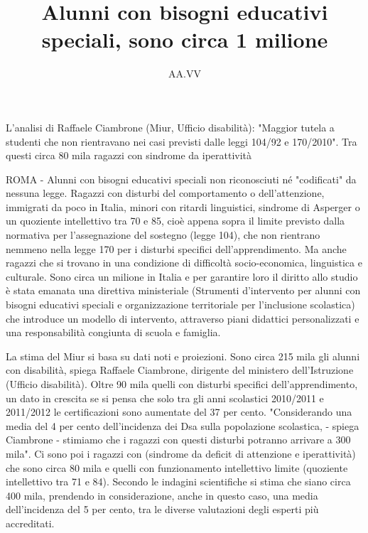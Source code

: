 \author{AA.VV}
\title{Alunni con bisogni educativi speciali, sono circa 1 milione}
\label{cha:ciambrone110613}
\maketitle
L'analisi di Raffaele Ciambrone (Miur, Ufficio disabilità): "Maggior tutela a studenti che non rientravano nei casi previsti dalle leggi 104/92 e 170/2010". Tra questi circa 80 mila ragazzi con sindrome da iperattività

ROMA - Alunni con bisogni educativi speciali non riconosciuti né "codificati" da nessuna legge. Ragazzi con disturbi del comportamento o dell'attenzione, immigrati da poco in Italia, minori con ritardi linguistici, sindrome di Asperger o un quoziente intellettivo tra 70 e 85, cioè appena sopra il limite previsto dalla normativa per l'assegnazione del sostegno (legge 104), che non rientrano nemmeno nella legge 170 per i disturbi specifici dell'apprendimento. Ma anche ragazzi che si trovano in una condizione di difficoltà socio-economica, linguistica e culturale. Sono circa un milione in Italia e per garantire loro il diritto allo studio è stata emanata una direttiva ministeriale (Strumenti d'intervento per alunni con bisogni educativi speciali e organizzazione territoriale per l'inclusione scolastica) che introduce un modello di intervento, attraverso piani didattici personalizzati e una responsabilità congiunta di scuola e famiglia.

La stima del Miur si basa su dati noti e proiezioni. Sono circa 215 mila gli alunni con disabilità, spiega Raffaele Ciambrone, dirigente del ministero dell'Istruzione (Ufficio disabilità). Oltre 90 mila quelli con disturbi specifici dell'apprendimento, un dato in crescita se si pensa che solo tra gli anni scolastici 2010/2011 e 2011/2012 le certificazioni sono aumentate del 37 per cento. "Considerando una media del 4 per cento dell'incidenza dei Dsa sulla popolazione scolastica, - spiega Ciambrone - stimiamo che i ragazzi con questi disturbi potranno arrivare a 300 mila". Ci sono poi i ragazzi con   (sindrome da deficit di attenzione e iperattività) che sono circa 80 mila e quelli con funzionamento intellettivo limite (quoziente intellettivo tra 71 e 84). Secondo le indagini scientifiche si stima che siano circa 400 mila, prendendo in considerazione, anche in questo caso, una media dell'incidenza del 5 per cento, tra le diverse valutazioni degli esperti più accreditati.

